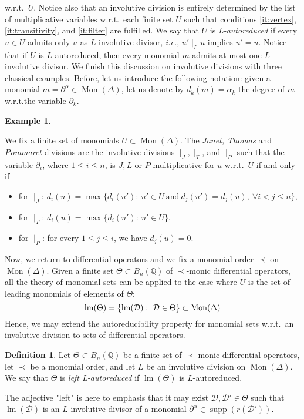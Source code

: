 \documentclass[11pt]{article}
\theoremstyle{definition}
\newtheorem{definition}[theorem]{Definition}
\newtheorem{example}[theorem]{Example}
\newcommand\ie{\emph{i.e.}}
\newcommand\wrt{w.r.t.}
\newcommand\D{\mathcal{D}}
\DeclareMathOperator{\supp}{supp}
\DeclareMathOperator{\lm}{lm}
\newcommand\Q{\mathbb{Q}}
\newcommand\Weyl[1]{B_{#1}(\Q)}
\newcommand\monBasis{\Mon(\Delta)}
\DeclareMathOperator{\Mon}{Mon}
\newcommand\divInv[1]{\mid_{#1}}
\begin{document}
\wrt\ $U$. Notice also that an involutive division is entirely
determined by the list of multiplicative variables \wrt\ each finite
set $U$ such that conditions \ref{it:vertex}, \ref{it:transitivity}, and
\ref{it:filter} are fulfilled. We say that $U$ is {\em L-autoreduced} if
every $u\in U$ admits only $u$ as $L$-involutive divisor, \ie,
$u'\divInv{L}u$ implies $u'=u$. Notice that if $U$ is $L$-autoreduced,
then every monomial $m$ admits at most one $L$-involutive divisor. We
finish this discussion on involutive divisions with three classical
examples. Before, let us introduce the following notation: given a
monomial $m=\partial^\alpha\in\monBasis$, let us denote by
$d_k(m)=\alpha_k$ the degree of $m$ \wrt the variable $\partial_k$.
\smallskip

\begin{example}\label{ex:involutive_division}

  We fix a finite set of monomials $U\subset\monBasis$. The
  {\em Janet, Thomas} and {\em Pommaret} divisions are the involutive
  divisions $\divInv{J},\divInv{T}$, and $\divInv{P}$ such that the
  variable $\partial_i$, where $1\leq i\leq n$, is
  $J,L$ or $P$-multiplicative for $u$ \wrt\ $U$ if and only if 
  \begin{itemize}
  \item for $\divInv{J}$: $d_i(u)=\max\{d_i(u'):\ u'\in U\ \text{and}\
    d_j(u')=d_j(u),\ \forall i<j\leq n\}$, 
  \item for $\divInv{T}$: $d_i(u)=\max\{d_i(u'):\ u'\in U\}$,
  \item for $\divInv{P}$: for every $1\leq j\leq i$, we have $d_j(u)=0$.
  \end{itemize}

  
\end{example}
\smallskip

Now, we return to differential operators and we fix a monomial order
$\prec$ on $\monBasis$. Given a finite set $\Theta\subset\Weyl{n}$ of
$\prec$-monic differential operators, all the theory of monomial sets can
be applied to the case where $U$ is the set of leading monomials of
elements of $\Theta$:
\[\lm(\Theta)=\left\{\lm(\D):\ \D\in\Theta\right\}\subset\monBasis
\smallskip\]
Hence, we may extend the autoreducibility property for monomial sets
\wrt\ an involutive division to sets of differential operators.
\smallskip

\begin{definition}
  Let $\Theta\subset\Weyl{n}$ be a finite set of $\prec$-monic
  differential operators, let $\prec$ be a monomial order, and let $L$ be
  an involutive division on $\Mon(\Delta)$. We say that $\Theta$ is
  {\em left L-autoreduced} if $\lm(\Theta)$ is $L$-autoreduced.
\end{definition}
\smallskip
\noindent
The adjective "left" is here to emphasis that it may exist
$\D,\D'\in\Theta$ such that $\lm(\D)$ is an $L$-involutive divisor of a
monomial $\partial^\alpha\in\supp(r(\D'))$.
\medskip
\end{document}
